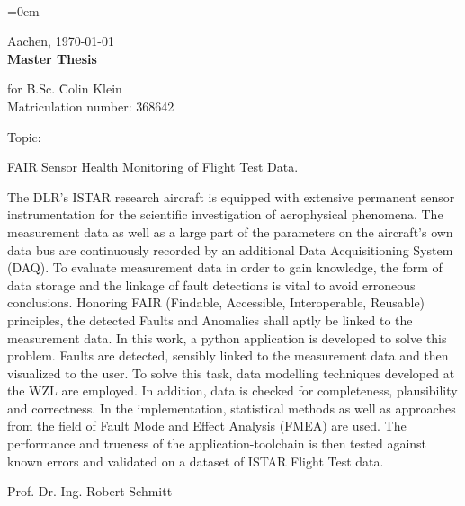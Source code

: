 \pagestyle{empty}
~
\newpage
{}
\parindent=0em

Aachen, \verbosedate\today\\

{\huge \bf Master Thesis}\\[1cm] %


\begin{tabbing}
for B.Sc. \quad \= Colin Klein\\
\> Matriculation number: 368642\\

	
\end{tabbing}

\begin{minipage}[t]{0.1\textwidth}
Topic: %
\quad
\end{minipage}
\begin{minipage}[t]{0.9\textwidth}
	FAIR Sensor Health Monitoring of Flight Test Data.\\
\end{minipage}

The DLR's ISTAR research aircraft is equipped with extensive permanent sensor instrumentation for the scientific investigation of aerophysical phenomena. The measurement data as well as a large part of the parameters on the aircraft's own data bus are continuously recorded by an additional Data Acquisitioning System (DAQ). To evaluate measurement data in order to gain knowledge, the form of data storage and the linkage of fault detections is vital to avoid erroneous conclusions.
Honoring FAIR (Findable, Accessible, Interoperable, Reusable) principles, the detected Faults and Anomalies shall aptly be linked to the measurement data.
In this work, a python application is developed to solve this problem. Faults are detected, sensibly linked to the measurement data and then visualized to the user.
To solve this task, data modelling techniques developed at the WZL are employed. In addition, data is checked for completeness, plausibility and correctness. In the implementation, statistical methods as well as approaches from the field of Fault Mode and Effect Analysis (FMEA) are used.
The performance and trueness of the application-toolchain is then tested against known errors and validated on a dataset of ISTAR Flight Test data.
\\


\vspace{4cm}

Prof. Dr.-Ing. Robert Schmitt

